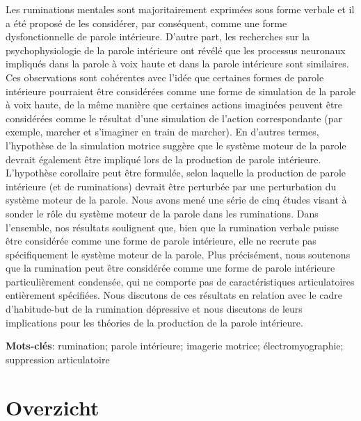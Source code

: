 \documentclass[a4paper,12pt,twoside,openright,oldfontcommands]{memoir}
\newcommand{\initial}[1]{
	\lettrine[lines=3,lhang=0.33,nindent=0em]{
		\color{gray}
     		{\textsc{#1}}}{}}
\newcommand{\clearemptydoublepage}{\newpage{\thispagestyle{empty}\cleardoublepage}}
\begin{document}
\initial{L}es ruminations mentales sont majoritairement exprimées sous forme verbale et il a été proposé de les considérer, par conséquent, comme une forme dysfonctionnelle de parole intérieure. D'autre part, les recherches sur la psychophysiologie de la parole intérieure ont révélé que les processus neuronaux impliqués dans la parole à voix haute et dans la parole intérieure sont similaires. Ces observations sont cohérentes avec l'idée que certaines formes de parole intérieure pourraient être considérées comme une forme de simulation de la parole à voix haute, de la même manière que certaines actions imaginées peuvent être considérées comme le résultat d'une simulation de l'action correspondante (par exemple, marcher et s'imaginer en train de marcher). En d'autres termes, l'hypothèse de la simulation motrice suggère que le système moteur de la parole devrait également être impliqué lors de la production de parole intérieure. L'hypothèse corollaire peut être formulée, selon laquelle la production de parole intérieure (et de ruminations) devrait être perturbée par une perturbation du système moteur de la parole. Nous avons mené une série de cinq études visant à sonder le rôle du système moteur de la parole dans les ruminations. Dans l'ensemble, nos résultats soulignent que, bien que la rumination verbale puisse être considérée comme une forme de parole intérieure, elle ne recrute pas spécifiquement le système moteur de la parole. Plus précisément, nous soutenons que la rumination peut être considérée comme une forme de parole intérieure particulièrement condensée, qui ne comporte pas de caractéristiques articulatoires entièrement spécifiées. Nous discutons de ces résultats en relation avec le cadre d'habitude-but de la rumination dépressive et nous discutons de leurs implications pour les théories de la production de la parole intérieure.

\vspace{\baselineskip}

\textbf{Mots-clés}: rumination; parole intérieure; imagerie motrice; électromyographie; suppression articulatoire

\clearemptydoublepage

\chapter*{Overzicht}
\end{document}
